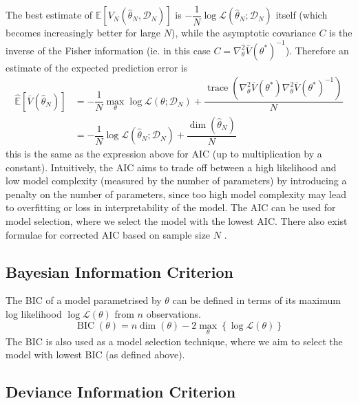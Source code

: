 \documentclass[11pt]{report} %
\begin{document}
The best estimate of $\mathbb{E}\left[V_{N}\left(\hat{\theta}_{N}, \mathcal{D}_{N}\right)\right]$ is $-\dfrac{1}{N}\log\mathcal{L}\left(\hat{\theta}_{N}; \mathcal{D}_{N}\right)$ itself (which becomes increasingly better for large $N$), while the asymptotic covariance $C$ is the inverse of the Fisher information (ie. in this case $C = \nabla_{\theta}^{2}\bar{V}\left(\theta^{*}\right)^{-1}$). Therefore an estimate of the expected prediction error is
\begin{align}
\widehat{\mathbb{E}}\left[\bar{V}\left(\hat{\theta}_{N}\right)\right] &= -\dfrac{1}{N}\max_{\theta}\log\mathcal{L}\left(\theta; \mathcal{D}_{N}\right) + \dfrac{\operatorname{trace}\left(\nabla_{\theta}^{2}\bar{V}\left(\theta^{*}\right)\nabla_{\theta}^{2}\bar{V}\left(\theta^{*}\right)^{-1}\right)}{N} \\
&= -\dfrac{1}{N}\log\mathcal{L}\left(\hat{\theta}_{N}; \mathcal{D}_{N}\right) + \dfrac{\dim\left(\hat{\theta}_{N}\right)}{N}
\end{align}
this is the same as the expression above for AIC (up to multiplication by a constant). Intuitively, the AIC aims to trade off between a high likelihood and low model complexity (measured by the number of parameters) by introducing a penalty on the number of parameters, since too high model complexity may lead to overfitting or loss in interpretability of the model. The AIC can be used for model selection, where we select the model with the lowest AIC. There also exist formulae for corrected AIC based on sample size $N$ \cite{Claeskens2008}.

\subsection{Bayesian Information Criterion}

The BIC of a model parametrised by $\theta$ can be defined in terms of its maximum log likelihood $\log\mathcal{L}\left(\theta\right)$ from $n$ observations.
\begin{equation}
\operatorname{BIC}\left(\theta\right) = n\dim\left(\theta\right) - 2\max_{\theta}\left\{\log\mathcal{L}\left(\theta\right)\right\}
\end{equation}
The BIC is also used as a model selection technique, where we aim to select the model with lowest BIC (as defined above).

\subsection{Deviance Information Criterion}
\end{document}
